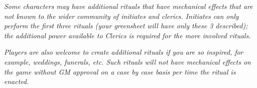 \documentclass[blue]{GL2020}
\begin{document}
\emph{Some characters may have additional rituals that have mechanical effects that are not known to the wider community of initiates and clerics. Initiates can only perform the first three rituals (your greensheet will have only these 3 described); the additional power available to Clerics is required for the more involved rituals.}

\emph{Players are also welcome to create additional rituals if you are so inspired, for example, weddings, funerals, etc. Such rituals will not have mechanical effects on the game without GM approval on a case by case basis per time the ritual is enacted.}
\end{document}
